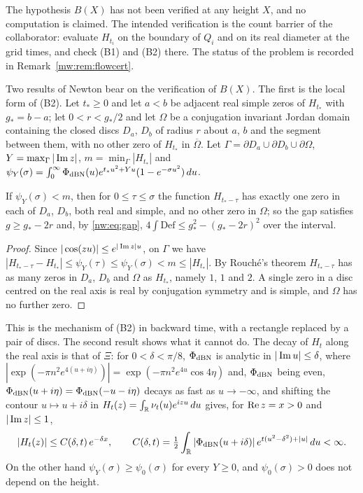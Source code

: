 The hypothesis $B(X)$ has not been verified at any height $X$, and no computation is claimed. The intended verification is the count barrier of the collaborator: evaluate $H_{t_i}$ on the boundary of $Q_i$ and on its real diameter at the grid times, and check (B1) and (B2) there. The status of the problem is recorded in Remark~\ref{mw:rem:flowcert}.

Two results of Newton \cite{Newton26} bear on the verification of $B(X)$. The first is the local form of (B2). Let $t_*\ge0$ and let $a<b$ be adjacent real simple zeros of $H_{t_*}$ with $g_*=b-a$; let $0<r<g_*/2$ and let $\Omega$ be a conjugation invariant Jordan domain containing the closed discs $D_a$, $D_b$ of radius $r$ about $a$, $b$ and the segment between them, with no other zero of $H_{t_*}$ in $\overline\Omega$. Let $\Gamma=\partial D_a\cup\partial D_b\cup\partial\Omega$, $Y=\max_\Gamma|\operatorname{Im} z|$, $m=\min_\Gamma|H_{t_*}|$ and $\psi_Y(\sigma)=\int_0^\infty\Phi_{\rm dBN}(u)e^{t_*u^2+Yu}(1-e^{-\sigma u^2})\,du$.

\begin{proposition}[Newton]\label{nw:prop:local}
If $\psi_Y(\sigma)<m$, then for $0\le\tau\le\sigma$ the function $H_{t_*-\tau}$ has exactly one zero in each of $D_a$, $D_b$, both real and simple, and no other zero in $\Omega$; so the gap satisfies $g\ge g_*-2r$ and, by \eqref{nw:eq:gap}, $4\int\mathrm{Def}\le g_*^2-(g_*-2r)^2$ over the interval.
\end{proposition}

\begin{proof}
Since $|\cos(zu)|\le e^{|\operatorname{Im} z|u}$, on $\Gamma$ we have $|H_{t_*-\tau}-H_{t_*}|\le\psi_Y(\tau)\le\psi_Y(\sigma)<m\le|H_{t_*}|$. By Rouch\'e's theorem $H_{t_*-\tau}$ has as many zeros in $D_a$, $D_b$ and $\Omega$ as $H_{t_*}$, namely $1$, $1$ and $2$. A single zero in a disc centred on the real axis is real by conjugation symmetry and is simple, and $\Omega$ has no further zero.
\end{proof}

This is the mechanism of (B2) in backward time, with a rectangle replaced by a pair of discs. The second result shows what it cannot do. The decay of $H_t$ along the real axis is that of $\Xi$: for $0<\delta<\pi/8$, $\Phi_{\rm dBN}$ is analytic in $|\operatorname{Im} u|\le\delta$, where $|\exp(-\pi n^2e^{4(u+i\eta)})|=\exp(-\pi n^2e^{4u}\cos4\eta)$ and, $\Phi_{\rm dBN}$ being even, $\Phi_{\rm dBN}(u+i\eta)=\Phi_{\rm dBN}(-u-i\eta)$ decays as fast as $u\to-\infty$, and shifting the contour $u\mapsto u+i\delta$ in $H_t(z)=\int_{\mathbb{R}}\nu_t(u)e^{izu}\,du$ gives, for $\operatorname{Re} z=x>0$ and $|\operatorname{Im} z|\le1$,
\[
|H_t(z)|\le C(\delta,t)\,e^{-\delta x},\qquad C(\delta,t)=\tfrac12\int_{\mathbb{R}}|\Phi_{\rm dBN}(u+i\delta)|\,e^{t(u^2-\delta^2)+|u|}\,du<\infty .
\]
On the other hand $\psi_Y(\sigma)\ge\psi_0(\sigma)$ for every $Y\ge0$, and $\psi_0(\sigma)>0$ does not depend on the height.

